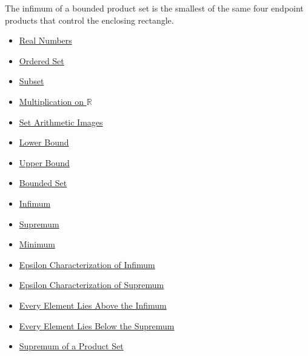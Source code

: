 \begin{remark*}[Interpretation]
The infimum of a bounded product set is the smallest of the same four endpoint
products that control the enclosing rectangle.
\end{remark*}

\begin{dependencies}
\begin{itemize}
  \item \hyperref[def:reals]{Real Numbers}
  \item \hyperref[def:ordered-set]{Ordered Set}
  \item \hyperref[def:subset]{Subset}
  \item \hyperref[def:multiplication-on-r]{Multiplication on $\mathbb{R}$}
  \item \hyperref[def:set-arithmetic-images]{Set Arithmetic Images}
  \item \hyperref[def:real-lower-bound]{Lower Bound}
  \item \hyperref[def:real-upper-bound]{Upper Bound}
  \item \hyperref[def:bounded]{Bounded Set}
  \item \hyperref[def:infimum]{Infimum}
  \item \hyperref[def:supremum]{Supremum}
  \item \hyperref[def:minimum]{Minimum}
  \item \hyperref[def:epsilon-characterization-of-infimum]{Epsilon Characterization of Infimum}
  \item \hyperref[def:epsilon-characterization-of-supremum]{Epsilon Characterization of Supremum}
  \item \hyperref[prop:every-element-lies-above-the-infimum]{Every Element Lies Above the Infimum}
  \item \hyperref[prop:every-element-lies-below-the-supremum]{Every Element Lies Below the Supremum}
  \item \hyperref[thm:supremum-product-set]{Supremum of a Product Set}
\end{itemize}
\end{dependencies}

